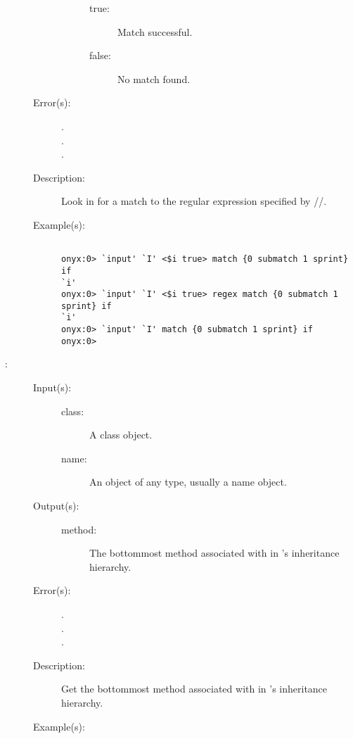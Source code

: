 \begin{description}
\begin{description}
\begin{description}
\begin{description}
			\item[true: ] Match successful.
			\item[false: ] No match found.
			\end{description}
		\end{description}
	\item[Error(s): ]
		\begin{description}\item[]
		\item[.]
		\item[.]
		\item[.]
		\end{description}
	\item[Description: ]
		Look in  for a match to the regular expression
		specified by //.
	\item[Example(s): ]\begin{verbatim}

onyx:0> `input' `I' <$i true> match {0 submatch 1 sprint} if
`i'
onyx:0> `input' `I' <$i true> regex match {0 submatch 1 sprint} if
`i'
onyx:0> `input' `I' match {0 submatch 1 sprint} if
onyx:0>
		\end{verbatim}
	\end{description}
\label{systemdict:method}
\item[{\onyxop{class name}{method}{method}}: ]
	\begin{description}\item[]
	\item[Input(s): ]
		\begin{description}\item[]
		\item[class: ]
			A class object.
		\item[name: ]
			An object of any type, usually a name object.
		\end{description}
	\item[Output(s): ]
		\begin{description}\item[]
		\item[method: ]
			The bottommost method associated with  in
			's inheritance hierarchy.
		\end{description}
	\item[Error(s): ]
		\begin{description}\item[]
		\item[.]
		\item[.]
		\item[.]
		\end{description}
	\item[Description: ]
		Get the bottommost method associated with  in
		's inheritance hierarchy.
	\item[Example(s): ]\begin{verbatim}


\end{verbatim}
\end{description}
\end{description}
